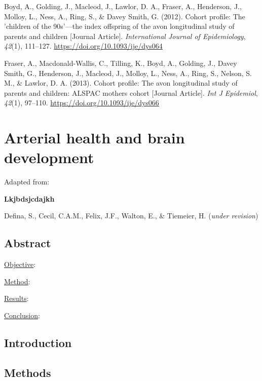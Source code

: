 \documentclass[
  letterpaper,
  DIV=11,
  numbers=noendperiod]{scrreport}
\newlength{\cslhangindent}
\newenvironment{CSLReferences}[2] %
 {\begin{list}{}{%
  \setlength{\itemindent}{0pt}
  \setlength{\leftmargin}{0pt}
  \setlength{\parsep}{0pt}
  \ifodd #1
   \setlength{\leftmargin}{\cslhangindent}
   \setlength{\itemindent}{-1\cslhangindent}
  \fi
  \setlength{\itemsep}{#2\baselineskip}}}
 {\end{list}}
\begin{document}
\label{refs--6}
\begin{CSLReferences}{1}{0}
Boyd, A., Golding, J., Macleod, J., Lawlor, D. A., Fraser, A.,
Henderson, J., Molloy, L., Ness, A., Ring, S., \& Davey Smith, G.
(2012). Cohort profile: The 'children of the 90s'---the index offspring
of the avon longitudinal study of parents and children {[}Journal
Article{]}. \emph{International Journal of Epidemiology}, \emph{42}(1),
111--127. \url{https://doi.org/10.1093/ije/dys064}

Fraser, A., Macdonald-Wallis, C., Tilling, K., Boyd, A., Golding, J.,
Davey Smith, G., Henderson, J., Macleod, J., Molloy, L., Ness, A., Ring,
S., Nelson, S. M., \& Lawlor, D. A. (2013). Cohort profile: The avon
longitudinal study of parents and children: ALSPAC mothers cohort
{[}Journal Article{]}. \emph{Int J Epidemiol}, \emph{42}(1), 97--110.
\url{https://doi.org/10.1093/ije/dys066}

\end{CSLReferences}

\chapter{Arterial health and brain development}\label{sec-chapter7}

Adapted from:

\textbf{Lkjbdsjcdajkh}

Defina, S., Cecil, C.A.M., Felix, J.F., Walton, E., \& Tiemeier, H.
(\emph{under revision})

\section*{Abstract}\label{abstract-5}


\ul{Objective}:

\ul{Method}:

\ul{Results}:

\ul{Conclusion}:

\newpage

\section{Introduction}\label{introduction-5}

\section{Methods}\label{methods-5}
\end{document}
